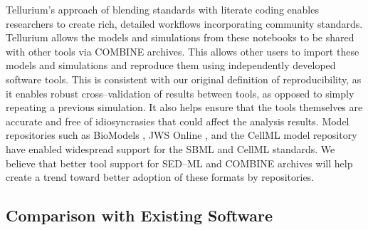 \documentclass[10pt,letterpaper]{article}
\begin{document}
Tellurium's approach of blending standards with literate coding enables researchers to create rich, detailed workflows incorporating community standards. Tellurium allows the models and simulations from these notebooks to be shared with other tools via COMBINE archives. This allows other users to import these models and simulations and reproduce them using independently developed software tools. This is consistent with our original definition of reproducibility, as it enables robust cross--validation of results between tools, as opposed to simply repeating a previous simulation. It also helps ensure that the tools themselves are accurate and free of idiosyncrasies that could affect the analysis results. Model repositories such as BioModels \cite{le2006biomodels,li2010biomodels}, JWS Online \cite{olivier2004web}, and the CellML model repository \cite{lloyd2008cellml} have enabled widespread support for the SBML and CellML standards. We believe that better tool support for SED--ML and COMBINE archives will help create a trend toward better adoption of these formats by repositories. %

\subsection*{Comparison with Existing Software}
\end{document}
